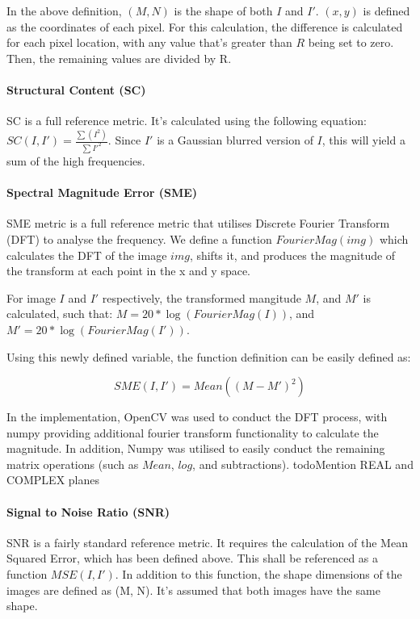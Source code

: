 \documentclass[11pt,a4paper]{article}
\begin{document}
                In the above definition, $(M, N)$ is the shape of both $I$ and $I'$. $(x, y)$ is defined as the coordinates of each pixel. For this calculation,
                the difference is calculated for each pixel location, with any value that's greater than $R$ being set to zero. Then, the remaining values are divided by R.

            \paragraph{Structural Content (SC)}
                SC is a full reference metric. It's calculated using the following equation: $SC(I, I') = \frac{\sum(I^2)}{\sum{I'^2}}$.
                Since $I'$ is a Gaussian blurred version of $I$, this will yield a sum of the high frequencies.

            \paragraph{Spectral Magnitude Error (SME)}
                SME metric is a full reference metric that utilises Discrete Fourier Transform (DFT) to analyse the frequency.
                We define a function $FourierMag(img)$ which calculates the DFT of the image $img$, shifts it, and produces the magnitude of the transform at each point in the x and y space.

                For image $I$ and $I'$ respectively, the transformed mangitude $M$, and $M'$ is calculated, such that:
                $M = 20*\log(FourierMag(I))$, and $M' = 20 * \log(FourierMag(I'))$.

                Using this newly defined variable, the function definition can be easily defined as:

                $$SME(I, I') = Mean((M - M')^2)$$

                In the implementation, OpenCV was used to conduct the DFT process, with numpy providing additional fourier transform functionality to calculate the magnitude. In addition, Numpy
                was utilised to easily conduct the remaining matrix operations (such as $Mean$, $log$, and subtractions).
                \(\)todo{Mention REAL and COMPLEX planes}
            \paragraph{Signal to Noise Ratio (SNR)}
                SNR is a fairly standard reference metric. It requires the calculation of the Mean Squared Error, which has been defined above. This shall be referenced as a function $MSE(I, I')$.
                In addition to this function, the shape dimensions of the images are defined as (M, N). It's assumed that both images have the same shape.
\end{document}
